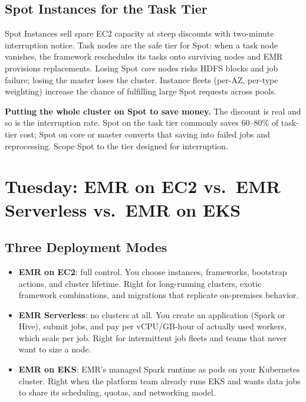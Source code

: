 \subsection{Spot Instances for the Task Tier}
Spot Instances sell spare EC2 capacity at steep discounts with two-minute interruption notice. Task nodes are the safe tier for Spot: when a task node vanishes, the framework reschedules its tasks onto surviving nodes and EMR provisions replacements. Losing Spot \emph{core} nodes risks HDFS blocks and job failure; losing the master loses the cluster. Instance fleets (per-AZ, per-type weighting) increase the chance of fulfilling large Spot requests across pools.

\begin{pitfall}
\textbf{Putting the whole cluster on Spot to save money.} The discount is real and so is the interruption rate. Spot on the task tier commonly saves 60--80\% of task-tier cost; Spot on core or master converts that saving into failed jobs and reprocessing. Scope Spot to the tier designed for interruption.
\end{pitfall}

\section{Tuesday: EMR on EC2 vs.\ EMR Serverless vs.\ EMR on EKS}
\subsection{Three Deployment Modes}
\begin{itemize}
    \item \textbf{EMR on EC2}: full control. You choose instances, frameworks, bootstrap actions, and cluster lifetime. Right for long-running clusters, exotic framework combinations, and migrations that replicate on-premises behavior.
    \item \textbf{EMR Serverless}: no clusters at all. You create an application (Spark or Hive), submit jobs, and pay per vCPU/GB-hour of actually used workers, which scale per job. Right for intermittent job fleets and teams that never want to size a node.
    \item \textbf{EMR on EKS}: EMR's managed Spark runtime as pods on your Kubernetes cluster. Right when the platform team already runs EKS and wants data jobs to share its scheduling, quotas, and networking model.
\end{itemize}

